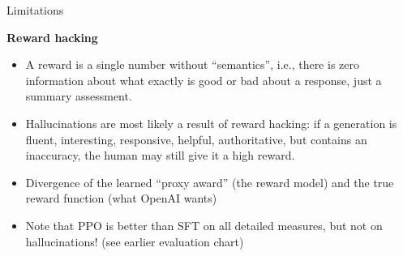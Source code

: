 \begin{vbframe}{Limitations}

\vfill

\textbf{Reward hacking}

	\begin{itemize}
		\item
                A reward is a single number without
		``semantics'', i.e., there is zero
		information about what exactly is good or
		bad about a response, just a summary
		assessment.
                
\item Hallucinations are most likely a result of reward
		hacking: if a generation is fluent,
	interesting, responsive, helpful, authoritative, but
	contains an inaccuracy, the human may still give it a
	high reward.
        \item Divergence of the learned ``proxy award'' (the
	reward model) and the true reward function (what
	OpenAI wants)
        \item Note that PPO is better than SFT on all
	detailed measures, but not on hallucinations! (see
	earlier evaluation chart)
	\end{itemize}

\vfill

\end{vbframe}


\endlecture

